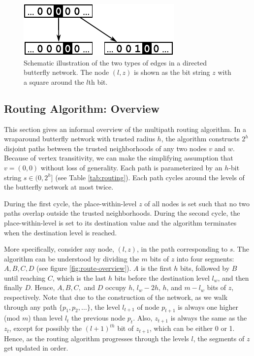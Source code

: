\documentclass[prodmode,permissions]{acmsmall-ec16}
\begin{document}
\begin{figure}
\begin{center}
\includegraphics{fig-butterfly.pdf}
\end{center}
\caption{
Schematic illustration of the two types of edges in a directed butterfly network.
The node $(l,z)$ is shown as the bit string $z$ with a square around the $l$th bit.
\label{fig:butterfly}
}
\end{figure}

\subsection{Routing Algorithm: Overview}

This section gives an informal overview of the multipath routing algorithm.
In a wraparound butterfly network with trusted radius $h$,
the algorithm constructs $2^h$ disjoint paths between the trusted neighborhoods
of any two nodes $v$ and $w$. Because of vertex transitivity, we can make the simplifying assumption that $v = (0,0)$ without loss of generality. Each path is parameterized by an $h$-bit string $s \in (0,2^h]$ (see Table \ref{tab:routing}). Each path cycles around the levels of the butterfly network at most twice.


During the first cycle, the place-within-level $z$ of all nodes is set such that
no two paths overlap outside the trusted neighborhoods.
During the second cycle, the place-within-level is set to its destination value
and the algorithm terminates when the destination level is reached.

More specifically, consider any node, $(l,z)$, in the path corresponding to $s$. The algorithm can be understood by dividing the $m$ bits of
$z$ into four segments: $A, B, C, D$ (see figure \ref{fig:route-overview}).
$A$ is the first $h$ bits, followed by $B$ until reaching $C$, which is the last $h$ bits before
the destination level $l_w$, and then finally $D$. Hence, $A, B, C, $ and $D$ occupy $h$, $l_w - 2h$, $h$, and $m - l_w$ bits of $z$, respectively. 
Note that due to the construction of the network, as we walk through any path $\{p_1, p_2, \dots\}$, the level $l_{t+1}$ of node $p_{t+1}$ is always one higher (mod $m$) than level $l_t$ the previous node $p_t$. Also, $z_{t+1}$ is always the same as the $z_t$, except for possibly the $(l+1)^{th}$ bit of $z_{t+1}$, which can be either 0 or 1. Hence, as the routing algorithm progresses through the levels $l$, the segments of $z$ get updated in order. 
\end{document}
